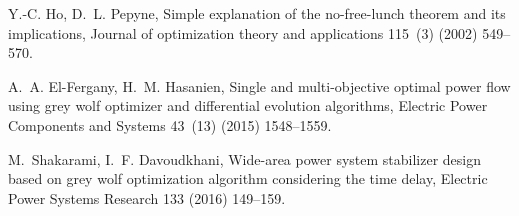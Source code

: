 \documentclass[review]{elsarticle}
\begin{document}
\begin{thebibliography}{10}
Y.-C. Ho, D.~L. Pepyne, Simple explanation of the no-free-lunch theorem and its
  implications, Journal of optimization theory and applications 115~(3) (2002)
  549--570.

A.~A. El-Fergany, H.~M. Hasanien, Single and multi-objective optimal power flow
  using grey wolf optimizer and differential evolution algorithms, Electric
  Power Components and Systems 43~(13) (2015) 1548--1559.

M.~Shakarami, I.~F. Davoudkhani, Wide-area power system stabilizer design based
  on grey wolf optimization algorithm considering the time delay, Electric
  Power Systems Research 133 (2016) 149--159.




\end{thebibliography}
\end{document}
